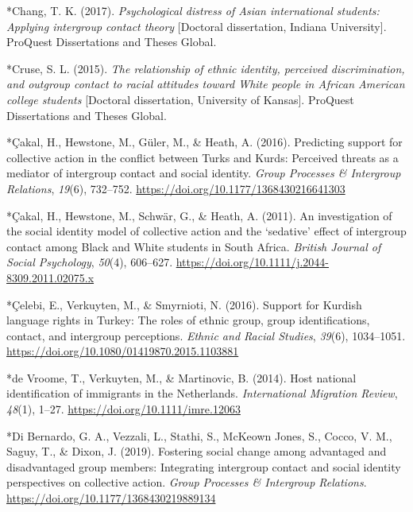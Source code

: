 \documentclass[12pt, letterpaper]{article}
\newenvironment{CSLReferences}[2]{}{}
\begin{document}
\begin{CSLReferences}{1}{0}
\leavevmode\hypertarget{ref-91}{}%
*Chang, T. K. (2017). \emph{Psychological distress of {A}sian
international students: Applying intergroup contact theory} {[}Doctoral
dissertation, Indiana University{]}. {ProQuest Dissertations and Theses
Global}.

\leavevmode\hypertarget{ref-1163}{}%
*Cruse, S. L. (2015). \emph{The relationship of ethnic identity,
perceived discrimination, and outgroup contact to racial attitudes
toward {White} people in {African} {American} college students}
{[}Doctoral dissertation, University of Kansas{]}. {ProQuest
Dissertations and Theses Global}.

\leavevmode\hypertarget{ref-1248}{}%
*Çakal, H., Hewstone, M., Güler, M., \& Heath, A. (2016). Predicting
support for collective action in the conflict between {Turks} and
{Kurds}: {Perceived} threats as a mediator of intergroup contact and
social identity. \emph{Group Processes \& Intergroup Relations},
\emph{19}(6), 732--752. \url{https://doi.org/10.1177/1368430216641303}

\leavevmode\hypertarget{ref-284}{}%
*Çakal, H., Hewstone, M., Schwär, G., \& Heath, A. (2011). An
investigation of the social identity model of collective action and the
{`sedative'} effect of intergroup contact among {Black} and {White}
students in {South} {Africa}. \emph{British Journal of Social
Psychology}, \emph{50}(4), 606--627.
\url{https://doi.org/10.1111/j.2044-8309.2011.02075.x}

\leavevmode\hypertarget{ref-1614}{}%
*Çelebi, E., Verkuyten, M., \& Smyrnioti, N. (2016). Support for
{Kurdish} language rights in {Turkey}: The roles of ethnic group, group
identifications, contact, and intergroup perceptions. \emph{Ethnic and
Racial Studies}, \emph{39}(6), 1034--1051.
\url{https://doi.org/10.1080/01419870.2015.1103881}

\leavevmode\hypertarget{ref-783}{}%
*de Vroome, T., Verkuyten, M., \& Martinovic, B. (2014). Host national
identification of immigrants in the {Netherlands}. \emph{International
Migration Review}, \emph{48}(1), 1--27.
\url{https://doi.org/10.1111/imre.12063}

\leavevmode\hypertarget{ref-3196}{}%
*Di Bernardo, G. A., Vezzali, L., Stathi, S., McKeown Jones, S., Cocco,
V. M., Saguy, T., \& Dixon, J. (2019). Fostering social change among
advantaged and disadvantaged group members: {Integrating} intergroup
contact and social identity perspectives on collective action.
\emph{Group Processes \& Intergroup Relations}.
\url{https://doi.org/10.1177/1368430219889134}


\end{CSLReferences}
\end{document}
